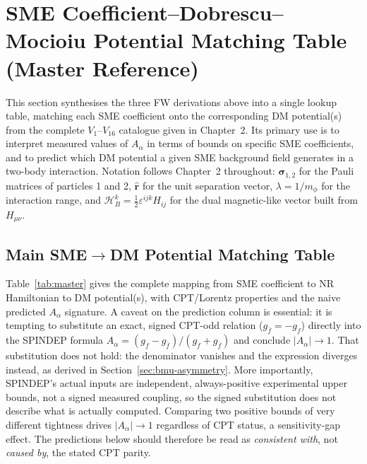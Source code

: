 \documentclass[main]{subfiles}
\begin{document}
\section{SME Coefficient--Dobrescu--Mocioiu Potential Matching Table (Master Reference)}
\label{sec:master}

This section synthesises the three FW derivations above into a single
lookup table, matching each SME coefficient onto the corresponding DM
potential(s) from the complete $V_1$--$V_{16}$ catalogue given in
Chapter~2. Its primary use is to interpret measured values of $A_\alpha$ in
terms of bounds on specific SME coefficients, and to predict which DM
potential a given SME background field generates in a two-body interaction.
Notation follows Chapter~2 throughout: $\boldsymbol\sigma_{1,2}$ for the
Pauli matrices of particles 1 and 2, $\hat{\mathbf r}$ for the unit
separation vector, $\lambda=1/m_\phi$ for the interaction range, and
$\mathcal H_B^k=\tfrac12\varepsilon^{ijk}H_{ij}$ for the dual magnetic-like
vector built from $H_{\mu\nu}$.

\subsection{Main SME\texorpdfstring{$\to$}{->}DM Potential Matching Table}

Table~\ref{tab:master} gives the complete mapping from SME coefficient to NR
Hamiltonian to DM potential(s), with CPT/Lorentz properties and the naive
predicted $A_\alpha$ signature. A caveat on the prediction column is
essential: it is tempting to substitute an exact, signed CPT-odd relation
($g_{\bar f}=-g_f$) directly into the SPINDEP formula
$A_\alpha=(g_f-g_{\bar f})/(g_f+g_{\bar f})$ and conclude $|A_\alpha|\to1$.
That substitution does not hold: the denominator vanishes and the
expression diverges instead, as derived in Section~\ref{sec:bmu-asymmetry}.
More importantly, SPINDEP's actual inputs are independent, always-positive
experimental upper bounds, not a signed measured coupling, so the signed
substitution does not describe what is actually computed. Comparing two
positive bounds of very different tightness drives $|A_\alpha|\to1$
regardless of CPT status, a sensitivity-gap effect. The predictions below
should therefore be read as \emph{consistent with}, not \emph{caused by},
the stated CPT parity.
\end{document}
